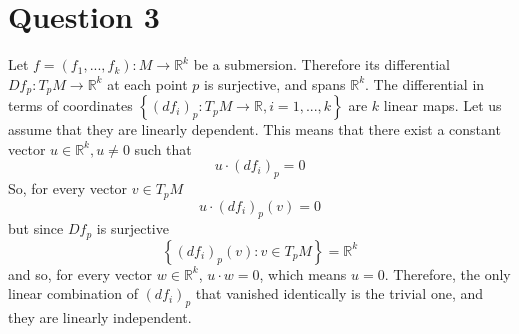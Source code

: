 \documentclass{article}
\newcommand{\R}{\ensuremath{\mathbb{R}}}
\begin{document}
\section*{Question 3}
Let $f = (f_1,..., f_k): M \rightarrow \R^k$ be a submersion. Therefore its differential $Df_p: T_p M \rightarrow \R^k$ at each point $p$ is surjective, and spans $\R^k$.
\newline
The differential in terms of coordinates $\left\{(df_i)_p: T_p M \rightarrow \R, i = 1,...,k\right\}$ are $k$ linear maps. Let us assume that they are linearly dependent. This means that there exist a constant vector $u \in \R^k, u \ne 0$ such that
\begin{equation}
    u \cdot \left(df_i\right)_p = 0
\end{equation}
So, for every vector $v \in T_p M$
\begin{equation}
    u \cdot \left(df_i\right)_p (v) = 0
\end{equation}
but since $Df_p$ is surjective
\begin{equation}
    \left\{\left(df_i\right)_p (v): v \in T_p M\right\} = \R^k
\end{equation}
and so, for every vector $w \in \R^k$, $u\cdot w = 0$, which means $u = 0$.
Therefore, the only linear combination of $(df_i)_p$ that vanished identically is the trivial one, and they are linearly independent.
\end{document}
